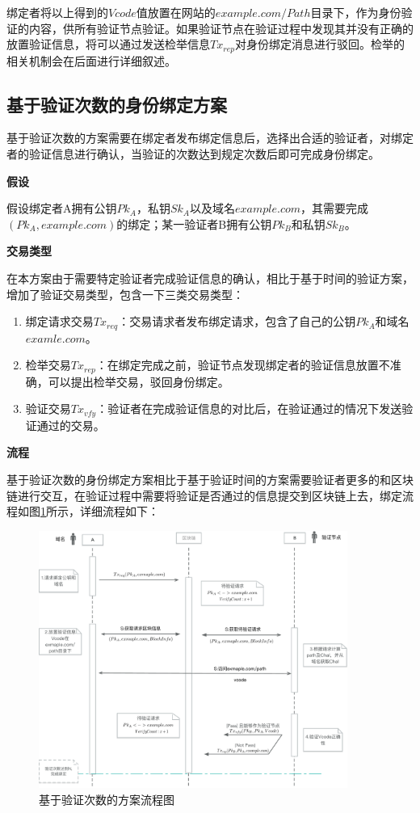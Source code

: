 绑定者将以上得到的$Vcode$值放置在网站的$example.com/Path$目录下，作为身份验证的内容，供所有验证节点验证。如果验证节点在验证过程中发现其并没有正确的放置验证信息，将可以通过发送检举信息$Tx_{rep}$对身份绑定消息进行驳回。检举的相关机制会在后面进行详细叙述。


\subsection{基于验证次数的身份绑定方案}\label{ver_num}

基于验证次数的方案需要在绑定者发布绑定信息后，选择出合适的验证者，对绑定者的验证信息进行确认，当验证的次数达到规定次数后即可完成身份绑定。

\noindent\textbf{假设}

假设绑定者A拥有公钥$Pk_A$，私钥$Sk_A$以及域名$example.com$，其需要完成$(Pk_A, example.com)$的绑定；某一验证者B拥有公钥$Pk_B$和私钥$Sk_B$。

\noindent\textbf{交易类型}

在本方案由于需要特定验证者完成验证信息的确认，相比于基于时间的验证方案，增加了验证交易类型，包含一下三类交易类型：

\begin{enumerate}
	\item 绑定请求交易$Tx_{req}$：交易请求者发布绑定请求，包含了自己的公钥$Pk_A$和域名$examle.com$。
	\item 检举交易$Tx_{rep}$：在绑定完成之前，验证节点发现绑定者的验证信息放置不准确，可以提出检举交易，驳回身份绑定。
	\item 验证交易$Tx_{vfy}$：验证者在完成验证信息的对比后，在验证通过的情况下发送验证通过的交易。
\end{enumerate}

\noindent\textbf{流程}

基于验证次数的身份绑定方案相比于基于验证时间的方案需要验证者更多的和区块链进行交互，在验证过程中需要将验证是否通过的信息提交到区块链上去，绑定流程如图\ref{fig:count_based_workflow}所示，详细流程如下：

\begin{figure}[htbp]
 	\centering
 	\includegraphics[width = 0.9\textwidth]{img/count_based_workflow}
 	\caption{基于验证次数的方案流程图}\label{fig:count_based_workflow}
\end{figure}

